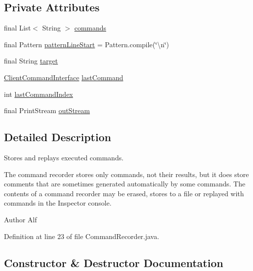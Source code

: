 \subsection*{Private Attributes}
\begin{DoxyCompactItemize}
\item 
final List$<$ String $>$ \hyperlink{classgov_1_1nasa_1_1jpf_1_1inspector_1_1client_1_1_command_recorder_a7ad7a5310decec4f7bbcde5b52d4aaf8}{commands}
\item 
final Pattern \hyperlink{classgov_1_1nasa_1_1jpf_1_1inspector_1_1client_1_1_command_recorder_a324b5fb1322e3f7814e0288c0b844baf}{pattern\+Line\+Start} = Pattern.\+compile(\char`\"{}\textbackslash{}n\char`\"{})
\item 
final String \hyperlink{classgov_1_1nasa_1_1jpf_1_1inspector_1_1client_1_1_command_recorder_aefb118ba4cce5d17fabc04cf09e1ba22}{target}
\item 
\hyperlink{interfacegov_1_1nasa_1_1jpf_1_1inspector_1_1client_1_1_client_command_interface}{Client\+Command\+Interface} \hyperlink{classgov_1_1nasa_1_1jpf_1_1inspector_1_1client_1_1_command_recorder_ac05b41431d0bb937eb7a12adae083dff}{last\+Command}
\item 
int \hyperlink{classgov_1_1nasa_1_1jpf_1_1inspector_1_1client_1_1_command_recorder_a842c677a69d9b386e86c08985b1ba1f9}{last\+Command\+Index}
\item 
final Print\+Stream \hyperlink{classgov_1_1nasa_1_1jpf_1_1inspector_1_1client_1_1_command_recorder_a1cf50f0b50bd4acfb1116506243f450e}{out\+Stream}
\end{DoxyCompactItemize}


\subsection{Detailed Description}
Stores and replays executed commands. 

The command recorder stores only commands, not their results, but it does store comments that are sometimes generated automatically by some commands. The contents of a command recorder may be erased, stores to a file or replayed with commands in the Inspector console.

\begin{DoxyAuthor}{Author}
Alf 
\end{DoxyAuthor}


Definition at line 23 of file Command\+Recorder.\+java.



\subsection{Constructor \& Destructor Documentation}
